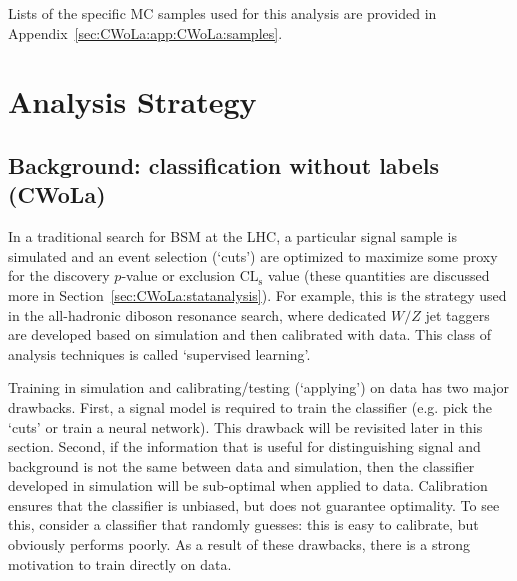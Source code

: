 Lists of the specific MC samples used for this analysis are provided in Appendix~\ref{sec:CWoLa:app:CWoLa:samples}.

\section{Analysis Strategy}
\label{sec:CWoLa:analysis}

\subsection{Background: classification without labels (CWoLa)}
\label{sec:CWoLa:schematic}

In a traditional search for BSM at the LHC, a particular signal sample is simulated and an event selection (`cuts') are optimized to maximize some proxy for the discovery $p$-value or exclusion $\text{CL}_\text{s}$ value (these quantities are discussed more in Section~\ref{sec:CWoLa:statanalysis}).  For example, this is the strategy used in the all-hadronic diboson resonance search, where dedicated $W/Z$ jet taggers are developed based on simulation and then calibrated with data.  This class of analysis techniques is called `supervised learning'.  

Training in simulation and calibrating/testing (`applying') on data has two major drawbacks.  First, a signal model is required to train the classifier (e.g. pick the `cuts' or train a neural network).  This drawback will be revisited later in this section.  Second, if the information that is useful for distinguishing signal and background is not the same between data and simulation, then the classifier developed in simulation will be sub-optimal when applied to data.  Calibration ensures that the classifier is unbiased, but does not guarantee optimality.  To see this, consider a classifier that randomly guesses: this is easy to calibrate, but obviously performs poorly.  As a result of these drawbacks, there is a strong motivation to train directly on data.

